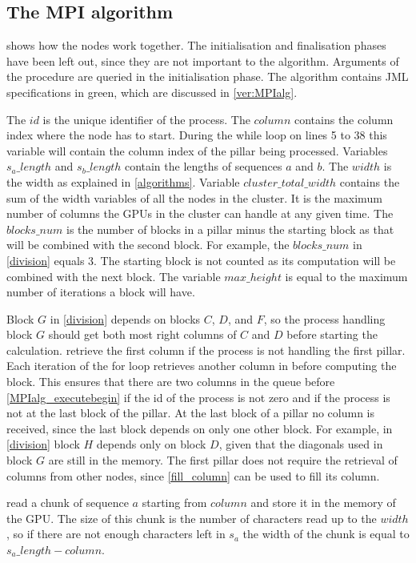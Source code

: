 \subsection{The MPI algorithm}
 shows how the nodes work together.
The initialisation and finalisation phases have been left out, since they are not important to the algorithm.
Arguments of the procedure are queried in the initialisation phase.
The algorithm contains JML specifications in green, which are discussed in \cref{ver:MPIalg}.

The $id$ is the unique identifier of the process.
The $column$ contains the column index where the node has to start. During the while loop on lines 5 to 38 this variable will contain the column index of the pillar being processed.
Variables $s_a\_length$ and $s_b\_length$ contain the lengths of sequences $a$ and $b$.
The $width$ is the width as explained in \cref{algorithms}.
Variable $cluster\_total\_width$ contains the sum of the width variables of all the nodes in the cluster.
It is the maximum number of columns the GPUs in the cluster can handle at any given time.
The $blocks\_num$ is the number of blocks in a pillar minus the starting block as that will be combined with the second block.
For example, the $blocks\_num$ in \cref{division} equals $3$.
The starting block is not counted as its computation will be combined with the next block.
The variable $max\_height$ is equal to the maximum number of iterations a block will have.

Block $G$ in \cref{division} depends on blocks $C$, $D$, and $F$, so the process handling block $G$ should get both most right columns of $C$ and $D$ before starting the calculation.
 retrieve the first column if the process is not handling the first pillar.
Each iteration of the for loop retrieves another column in  before computing the block.
This ensures that there are two columns in the queue before \cref{MPIalg_executebegin} if the id of the process is not zero and if the process is not at the last block of the pillar.
At the last block of a pillar no column is received, since the last block depends on only one other block.
For example, in \cref{division} block $H$ depends only on block $D$, given that the diagonals used in block $G$ are still in the memory.
The first pillar does not require the retrieval of columns from other nodes, since \cref{fill_column} can be used to fill its column.

 read a chunk of sequence $a$ starting from $column$ and store it in the memory of the GPU.
The size of this chunk is the number of characters read up to the $width$, so if there are not enough characters left in $s_a$ the width of the chunk is equal to $s_a\_length - column$.

